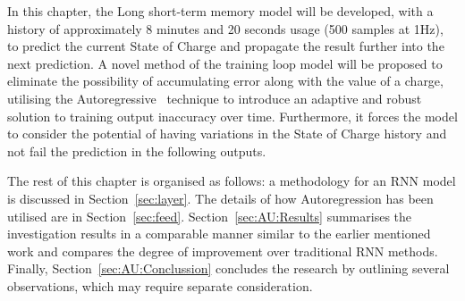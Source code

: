 %
%
In this chapter, the Long short-term memory model will be developed, with a history of approximately 8 minutes and 20 seconds usage (500 samples at 1Hz), to predict the current State of Charge and propagate the result further into the next prediction.
A novel method of the training loop model will be proposed to eliminate the possibility of accumulating error along with the value of a charge, utilising the Autoregressive~\cite{time_2020} technique to introduce an adaptive and robust solution to training output inaccuracy over time.
Furthermore, it forces the model to consider the potential of having variations in the State of Charge history and not fail the prediction in the following outputs.


%
%

%
%
The rest of this chapter is organised as follows: a methodology for an RNN model is discussed in Section~\ref{sec:layer}.
The details of how Autoregression has been utilised are in Section~\ref{sec:feed}.
Section~\ref{sec:AU:Results} summarises the investigation results in a comparable manner similar to the earlier mentioned work and compares the degree of improvement over traditional RNN methods.
Finally, Section~\ref{sec:AU:Conclussion} concludes the research by outlining several observations, which may require separate consideration.

